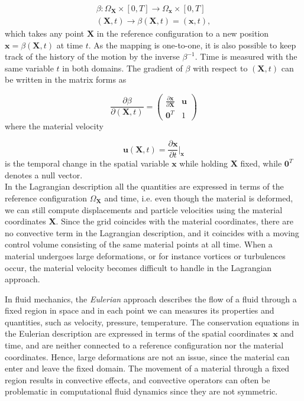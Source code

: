 \documentclass[a4paper,11pt,oneside]{book}
\begin{document}
\begin{align*}
\beta : \Omega_{\mathbf{X}} \times [0, T]  \rightarrow \Omega_\mathbf{x} \times [0, T] \\
(\mathbf{X} , t)  \rightarrow \beta(\mathbf{X}, t) = (\mathbf{x}, t),
\end{align*}
which takes any point $\mathbf{X}$ in the reference configuration to a new position $\mathbf{x} = \beta(\mathbf{X},t)$ at time $t$. As the mapping is one-to-one, it is also possible to keep track of the history of the motion by the inverse $\beta^{-1}$. Time is measured with the same variable $t$ in both domains. The gradient of $\beta$ with respect to $(\mathbf{X},t)$ can be written in the matrix forms as

\begin{equation}
\frac{\partial \beta}{\partial(\mathbf{X}, t)} = 
\begin{pmatrix}
\frac{\partial \mathbf{x}}{\partial \mathbf{X}} & \mathbf{u} \\
\mathbf{0}^T & 1
\end{pmatrix}
\end{equation}
where the material velocity

\begin{equation}
\mathbf{u}(\mathbf{X}, t) = \frac{\partial \mathbf{x}}{\partial t} {\Big |}_\mathbf{x}
\end{equation}
is the temporal change in the spatial variable $\mathbf{x}$ while holding $\mathbf{X}$ fixed, while $\mathbf{0}^T$ denotes a null vector. \\
In the Lagrangian description all the quantities are expressed in terms of the reference configuration $\Omega_{\mathbf{X}}$ and time, i.e. even though the material is deformed, we can still compute displacements and particle velocities using the material coordinates $\mathbf{X}$.
Since the grid coincides with the material coordinates, there are no convective term in the Lagrangian description, and it coincides with a moving control volume consisting of the same material points at all time. When a material undergoes large deformations, or for instance vortices or turbulences occur, the material velocity becomes difficult to handle in the Lagrangian approach.

In fluid mechanics, the \emph{Eulerian} approach describes the flow of a fluid through a fixed region in space and in each point we can measures its properties and quantities, such as velocity, pressure, temperature. The conservation equations in the Eulerian description are expressed in terms of the spatial coordinates $\mathbf{x}$ and time, and are neither connected to a reference configuration nor the material coordinates. Hence, large deformations are not an issue, since the material can enter and leave the fixed domain. The movement of a material through a fixed region results in convective effects, and convective operators can often be problematic in computational fluid dynamics since they are not symmetric.
\end{document}
